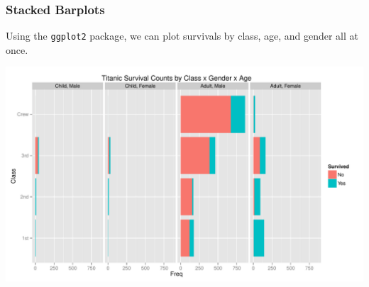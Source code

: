 \documentclass[handout]{beamer}
\newcommand{\blue}[1]{\textcolor{blue2}{#1}}
\begin{document}
%
%  
%
%


\begin{frame}[fragile]
\frametitle{Stacked Barplots}
Using the {\tt ggplot2} package, we can plot survivals by class, age, and gender all at once.

\begin{center}
\includegraphics[width=\textwidth]{figure/titanic.pdf}
\end{center}


\end{frame}
\end{document}
